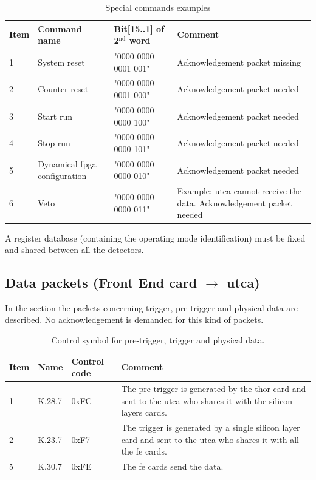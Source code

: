 \begin{table} [!htbp]
\centering
\caption{Special commands examples}
\label{chapappA::tab::specCmdExamples}
\begin{tabular}{m{1.5cm} M{4cm} M{4cm} M{4cm}}
\toprule
{}
\textbf{Item}  			& 	\textbf{Command name}	& \textbf{Bit[15..1] of 2$\mathrm{^{nd}}$ word} & \textbf{Comment} \\
				&	System reset				& "0000 0000 0001  001"  	& Acknowledgement packet missing \\
	2				&	Counter reset			& "0000 0000 0001  000"  	& Acknowledgement packet needed \\
	3				&	Start run					& "0000 0000 0000  100"  	& Acknowledgement packet needed\\
	4				&	Stop run					& "0000 0000 0000  101" 	& Acknowledgement packet needed\\
	5				&	Dynamical \gls{fpga} configuration		& "0000 0000 0000  010" 	& Acknowledgement packet needed\\
	6				&	Veto						& "0000 0000 0000  011" 	& Example: \gls{utca} cannot receive the data. Acknowledgement packet needed\\
\bottomrule
\end{tabular}
\end{table}

A register database (containing the operating mode identification) must be fixed and shared between all the detectors.

\subsection{Data packets (Front End card $\rightarrow$ \gls{utca})}\label{chapappA::subsec::dataPackets}
In the section the packets concerning trigger, pre-trigger and physical data are described.\newline
No acknowledgement is demanded for this kind of packets.

\begin{table} [!htbp]
\centering
\caption{Control symbol for pre-trigger, trigger and physical data.}
\label{chapappA::tab::ctrlSymbolTrigData}
\begin{tabular}{m{1.0cm} M{2cm} M{2cm} M{5cm}}
\toprule
{}
\textbf{Item}  			& 	\textbf{Name}	& \textbf{Control code} & \textbf{Comment} \\
				&	K.28.7	& 0xFC  	& The pre-trigger is generated by the \gls{thor} card and sent to the \gls{utca} who shares it with the silicon layers cards. \\
	2				&	K.23.7	& 0xF7  	& The trigger is generated by a single silicon layer card and sent to the \gls{utca} who shares it with all the \gls{fe} cards.\\

	5				&	K.30.7	& 0xFE	& The \gls{fe} cards send the data.  \\
\bottomrule
\end{tabular}
\end{table}


